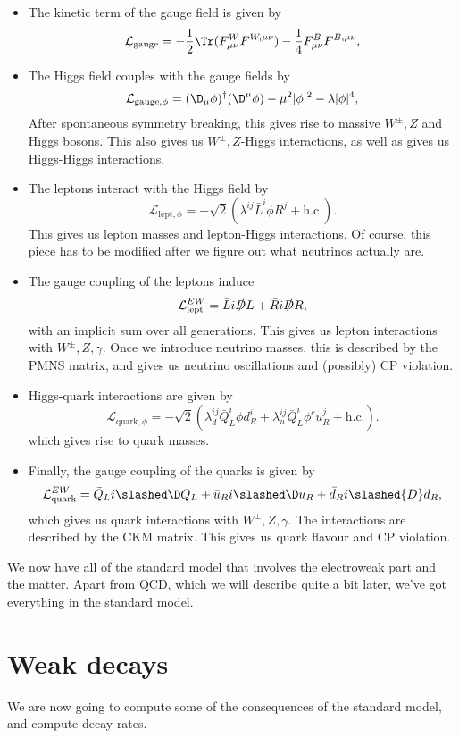 \documentclass[a4paper]{article}
\begin{document}
\begin{itemize}
  \item The kinetic term of the gauge field is given by
    \[
      \mathcal{L}_{\mathrm{gauge}} = -\frac{1}{2} \Tr (F^W_{\mu\nu} F^{W,\mu\nu}) - \frac{1}{4} F_{\mu\nu}^B F^{B, \mu\nu},
    \]
  \item The Higgs field couples with the gauge fields by
    \[
      \mathcal{L}_{\mathrm{gauge}, \phi} = (\D_\mu \phi)^\dagger (\D^\mu \phi) - \mu^2 |\phi|^2 - \lambda |\phi|^4,
    \]
    After spontaneous symmetry breaking, this gives rise to massive $W^{\pm}, Z$ and Higgs bosons. This also gives us $W^{\pm}, Z$-Higgs interactions, as well as gives us Higgs-Higgs interactions.
  \item The leptons interact with the Higgs field by
    \[
      \mathcal{L}_{\mathrm{lept}, \phi} =- \sqrt{2} (\lambda^{ij} \bar L^i \phi R^j + \mathrm{h.c.}).
    \]
    This gives us lepton masses and lepton-Higgs interactions. Of course, this piece has to be modified after we figure out what neutrinos actually are.
  \item The gauge coupling of the leptons induce
    \[
      \mathcal{L}_{\mathrm{lept}}^{EW} = \bar L i \slashed D L + \bar R i \slashed D R,
    \]
    with an implicit sum over all generations. This gives us lepton interactions with $W^{\pm}, Z, \gamma$. Once we introduce neutrino masses, this is described by the PMNS matrix, and gives us neutrino oscillations and (possibly) CP violation.
  \item Higgs-quark interactions are given by
    \[
      \mathcal{L}_{\mathrm{quark}, \phi} = - \sqrt{2} (\lambda_d^{ij} \bar{Q}_L^i \phi d_R^i + \lambda_u^{ij} \bar{Q}_L^i \phi^c u_R^j + \mathrm{h.c.}).
    \]
    which gives rise to quark masses.
  \item Finally, the gauge coupling of the quarks is given by
    \[
      \mathcal{L}_{\mathrm{quark}}^{EW} = \bar{Q}_L i \slashed \D Q_L + \bar{u}_R i \slashed\D u_R + \bar{d}_R i \slashed{D} d_R,
    \]
    which gives us quark interactions with $W^{\pm}, Z, \gamma$. The interactions are described by the CKM matrix. This gives us quark flavour and CP violation.
\end{itemize}

We now have all of the standard model that involves the electroweak part and the matter. Apart from QCD, which we will describe quite a bit later, we've got everything in the standard model.

\section{Weak decays}
We are now going to compute some of the consequences of the standard model, and compute decay rates.
\end{document}
